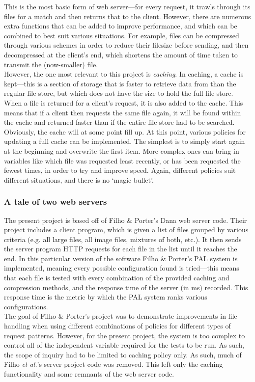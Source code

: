 \documentclass[compsoc,12pt,a4paper]{IEEEtran}
\begin{document}
				This is the most basic form of web server---for every request, it trawls through its files for a match and then returns that to the client. However, there are numerous extra functions that can be added to improve performance, and which can be combined to best suit various situations. For example, files can be compressed through various schemes in order to reduce their filesize before sending, and then decompressed at the client's end, which shortens the amount of time taken to transmit the (now-smaller) file.\\
				However, the one most relevant to this project is \textit{caching}. In caching, a cache is kept---this is a section of storage that is faster to retrieve data from than the regular file store, but which does not have the size to hold the full file store. When a file is returned for a client's request, it is also added to the cache. This means that if a client then requests the same file again, it will be found within the cache and returned faster than if the entire file store had to be searched.\\
				Obviously, the cache will at some point fill up. At this point, various policies for updating a full cache can be implemented. The simplest is to simply start again at the beginning and overwrite the first item. More complex ones can bring in variables like which file was requested least recently, or has been requested the fewest times, in order to try and improve speed. Again, different policies suit different situations, and there is no `magic bullet'.
				
			\subsubsection{A tale of two web servers}
			
				The present project is based off of Filho \& Porter's Dana web server code. Their project includes a client program, which is given a list of files grouped by various criteria (e.g. all large files, all image files, mixtures of both, etc.). It then sends the server program HTTP requests for each file in the list until it reaches the end. In this particular version of the software Filho \& Porter's PAL system is implemented, meaning every possible configuration found is tried---this means that each file is tested with every combination of the provided caching and compression methods, and the response time of the server (in ms) recorded. This response time is the metric by which the PAL system ranks various configurations.\\
				The goal of Filho \& Porter's project was to demonstrate improvements in file handling when using different combinations of policies for different types of request patterns. However, for the present project, the system is too complex to control all of the independent variable required for the tests to be run. As such, the scope of inquiry had to be limited to caching policy only. As such, much of Filho \textit{et al.}'s server project code was removed. This left only the caching functionality and some remnants of the web server code.
		
\end{document}
